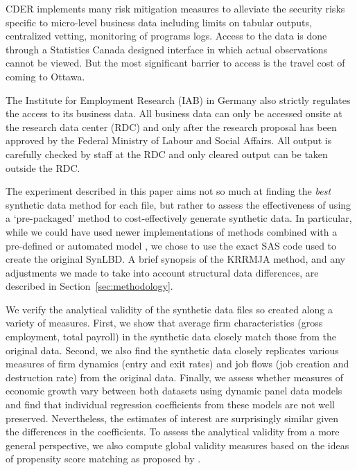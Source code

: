 CDER implements many risk mitigation measures to alleviate the security risks specific to micro-level business data including limits on tabular outputs, centralized vetting, monitoring of programs logs. Access to the data is done through a Statistics Canada designed interface in which actual observations cannot be viewed. But the most significant barrier to access is the travel cost of coming to Ottawa.

The Institute for Employment Research (IAB) in Germany also strictly regulates the access to its business data. All business data can only be accessed onsite at the research data center (RDC) and only after the research proposal has been approved by the Federal Ministry of Labour and Social Affairs. All output is carefully checked by staff at the RDC and only cleared output can be taken outside the RDC. 

The experiment described in this paper aims not so much at finding the \textit{best} synthetic data method for each file, but rather to assess the effectiveness of using a `pre-packaged' method to cost-effectively generate synthetic data. In particular, while we could have used newer implementations of methods combined with a pre-defined or automated model \citep{JSSv074i11,Raab_Nowok_Dibben_2018}, we chose to use the exact SAS code used to create the original \ac{SynLBD}. A brief synopsis of the KRRMJA method, and any adjustments we made to take into account structural data differences, are described in Section~\ref{sec:methodology}.

We verify the analytical validity of the synthetic data files so created along a variety of measures. First, we show that average firm characteristics (gross employment, total payroll) in the synthetic data closely match those from the original data. Second, we also find the synthetic data closely replicates various measures of firm dynamics (entry and exit rates) and job flows (job creation and destruction rate) from the original data. Finally, we assess whether measures of economic growth vary between both datasets using dynamic panel data models and find that individual regression coefficients from these models are not well preserved. Nevertheless, the estimates of interest are surprisingly similar given the differences in the coefficients. To assess the analytical validity from a more general perspective, we also compute global validity measures based on the ideas of propensity score matching as proposed by \citet{Woo_Reiter_Oganian_Karr_2009,Snoke_RSSA2018}.

